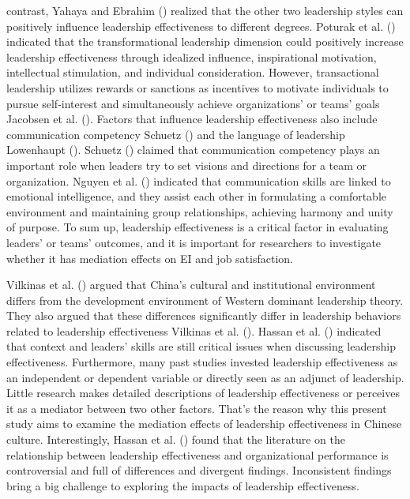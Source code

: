\documentclass[
  man,
  longtable,
  nolmodern,
  notxfonts,
  notimes,
  colorlinks=true,linkcolor=blue,citecolor=blue,urlcolor=blue]{apa7}
\begin{document}
contrast, Yahaya and Ebrahim () realized
that the other two leadership styles can positively influence leadership
effectiveness to different degrees. Poturak et al.
() indicated that the transformational
leadership dimension could positively increase leadership effectiveness
through idealized influence, inspirational motivation, intellectual
stimulation, and individual consideration. However, transactional
leadership utilizes rewards or sanctions as incentives to motivate
individuals to pursue self-interest and simultaneously achieve
organizations' or teams' goals Jacobsen et al.
(). Factors that influence leadership
effectiveness also include communication competency Schuetz
() and the language of leadership
Lowenhaupt (). Schuetz
() claimed that communication competency
plays an important role when leaders try to set visions and directions
for a team or organization. Nguyen et al.
() indicated that communication skills
are linked to emotional intelligence, and they assist each other in
formulating a comfortable environment and maintaining group
relationships, achieving harmony and unity of purpose. To sum up,
leadership effectiveness is a critical factor in evaluating leaders' or
teams' outcomes, and it is important for researchers to investigate
whether it has mediation effects on EI and job satisfaction.

Vilkinas et al. () argued that China's
cultural and institutional environment differs from the development
environment of Western dominant leadership theory. They also argued that
these differences significantly differ in leadership behaviors related
to leadership effectiveness Vilkinas et al.
(). Hassan et al.
() indicated that context and leaders'
skills are still critical issues when discussing leadership
effectiveness. Furthermore, many past studies invested leadership
effectiveness as an independent or dependent variable or directly seen
as an adjunct of leadership. Little research makes detailed descriptions
of leadership effectiveness or perceives it as a mediator between two
other factors. That's the reason why this present study aims to examine
the mediation effects of leadership effectiveness in Chinese culture.
Interestingly, Hassan et al. () found
that the literature on the relationship between leadership effectiveness
and organizational performance is controversial and full of differences
and divergent findings. Inconsistent findings bring a big challenge to
exploring the impacts of leadership effectiveness.
\end{document}
